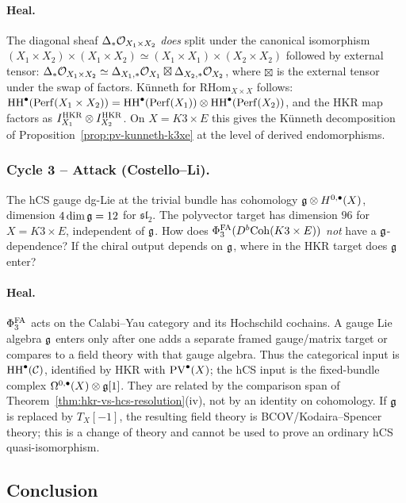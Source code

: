 \paragraph{Heal.}
The diagonal sheaf $\Delta_*\mathcal{O}_{X_1\times X_2}$ \emph{does} split
under the canonical isomorphism
$(X_1\times X_2)\times(X_1\times X_2) \simeq (X_1\times X_1)\times
(X_2\times X_2)$ followed by external tensor:
$\Delta_*\mathcal{O}_{X_1\times X_2} \simeq \Delta_{X_1,*}\mathcal{O}_{X_1}\boxtimes
\Delta_{X_2,*}\mathcal{O}_{X_2}$, where $\boxtimes$ is the external tensor
under the swap of factors. K\"unneth for $\mathrm{RHom}_{X\times X}$
follows: $\mathrm{HH}^\bullet(\mathrm{Perf}(X_1\times X_2)) =
\mathrm{HH}^\bullet(\mathrm{Perf}(X_1))\otimes\mathrm{HH}^\bullet(\mathrm{Perf}(X_2))$, and the HKR
map factors as $I^{\mathrm{HKR}}_{X_1}\otimes I^{\mathrm{HKR}}_{X_2}$. On
$X = K3\times E$ this gives the K\"unneth decomposition of
Proposition~\ref{prop:pv-kunneth-k3xe} at the level of derived
endomorphisms.

\subsubsection*{Cycle 3 -- Attack (Costello--Li).}
The hCS gauge dg-Lie at the trivial bundle has cohomology
$\mathfrak{g}\otimes H^{0,\bullet}(X)$, dimension $4\dim\mathfrak{g} = 12$ for
$\mathfrak{sl}_2$. The polyvector target has dimension $96$ for
$X = K3\times E$, independent of $\mathfrak{g}$. How does
$\Phi^{\mathrm{FA}}_3(D^b\mathrm{Coh}(K3\times E))$ \emph{not} have a $\mathfrak{g}$-dependence?
If the chiral output depends on $\mathfrak{g}$, where in the HKR target does
$\mathfrak{g}$ enter?

\paragraph{Heal.}
$\Phi^{\mathrm{FA}}_3$ acts on the Calabi--Yau category and its Hochschild
cochains. A gauge Lie algebra $\mathfrak{g}$ enters only after one adds a
separate framed gauge/matrix target or compares to a field theory with
that gauge algebra. Thus the categorical input is
$\mathrm{HH}^\bullet(\mathcal{C})$, identified by HKR with $\mathrm{PV}^\bullet(X)$; the hCS
input is the fixed-bundle complex
$\Omega^{0,\bullet}(X)\otimes\mathfrak{g}[1]$. They are related by the
comparison span of Theorem~\ref{thm:hkr-vs-hcs-resolution}(iv), not by
an identity on cohomology. If $\mathfrak{g}$ is replaced by $T_X[-1]$, the
resulting field theory is BCOV/Kodaira--Spencer theory; this is a
change of theory and cannot be used to prove an ordinary hCS
quasi-isomorphism.

\subsection*{Conclusion}

